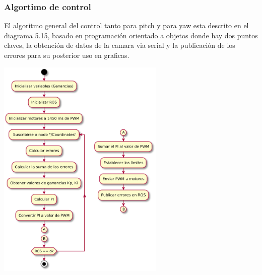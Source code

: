 \subsubsection{Algortimo de control}
El algoritmo general del control tanto para pitch y para yaw esta descrito en el diagrama 5.15, basado en programación orientado a objetos
donde hay dos puntos claves, la obtención de datos de la camara via serial y la publicación de los errores para su posterior uso en graficas.
\begin{center}
	\includegraphics[width=0.6\textwidth]{Contenido/Cuerpo/Capitulo5/Fig24.eps}
	\label{Fig4}
\end{center}

